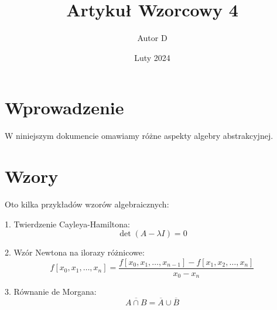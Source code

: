 \documentclass{article}
\title{Artykuł Wzorcowy 4}
\author{Autor D}
\date{Luty 2024}
\begin{document}
\maketitle

\section{Wprowadzenie}

W niniejszym dokumencie omawiamy różne aspekty algebry abstrakcyjnej.

\section{Wzory}

Oto kilka przykładów wzorów algebraicznych:

1. Twierdzenie Cayleya-Hamiltona:
\[ \det(A - \lambda I) = 0 \]

2. Wzór Newtona na ilorazy różnicowe:
\[ f[x_0, x_1, \ldots, x_n] = \frac{f[x_0, x_1, \ldots, x_{n-1}] - f[x_1, x_2, \ldots, x_n]}{x_0 - x_n} \]

3. Równanie de Morgana:
\[ \overline{A \cap B} = \overline{A} \cup \overline{B} \]
\end{document}
